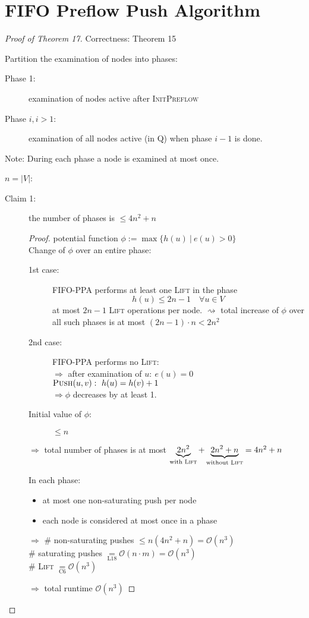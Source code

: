 \documentclass[12pt,oneside,a4paper,parskip=on,fleqn]{scrartcl}
\begin{document}
\section*{FIFO Preflow Push Algorithm} %
\label{sec:fifo_preflow_push_algorithm}
	\begin{proof}[Proof of Theorem 17]
		Correctness: Theorem 15 \checkmark

		Partition the examination of nodes into phases:
		\begin{description}
			\item[Phase 1:] examination of nodes active after \textsc{InitPreflow}
			\item[Phase $i,i>1$:] examination of all nodes active (\glqq in Q\grqq) when phase $i-1$ is done.
		\end{description}
		Note: During each phase a node is examined at most once.

		$n=|V|$:
		\begin{description}
			\item[Claim 1:] the number of phases is $\leq 4n^2 + n$
			\begin{proof}
				potential function $\phi := \max\{h(u)\ |\ e(u) > 0\}$\\
				Change of $\phi$ over an entire phase:
				\begin{description}
					\item[1st case:]FIFO-PPA performs at least one \textsc{Lift} in the phase
					\[
						h(u) \leq 2n-1 \quad \forall u\in V
					\]
					at most $2n-1$ \textsc{Lift} operations per node.
					$\rightsquigarrow$ total increase of $\phi$ over all such phases is at most $(2n-1)\cdot n < 2n^2$
					\item[2nd case:] FIFO-PPA performs no \textsc{Lift}:\\
					$\Rightarrow$ after examination of $u:\ e(u) = 0$\\
					$\textsc{Push}(u,v):\ h(u) = h(v) + 1$\\
					$\Rightarrow \phi$ decreases by at least 1.
					\item[Initial value of $\phi$:] $\leq n$
				\end{description}
				$\Rightarrow$ total number of phases is at most $\underbrace{2n^2}_{\text{with}\textsc{ Lift}} + \underbrace{2n^2+n}_{\text{without}\textsc{ Lift}} = 4n^2 + n$

				In each phase:
				\begin{itemize}
					\item at most one non-saturating push per node
					\item each node is considered at most once in a phase
				\end{itemize}
				$\Rightarrow$ \# non-saturating pushes $\leq n(4n^2+n) = \mathcal{O}(n^3)$\\
				\# saturating pushes $\underset{\text{L18}}{=} \mathcal{O}(n\cdot m) = \mathcal{O}(n^3)$\\
				\# \textsc{Lift} $\underset{\text{C6}}{=} \mathcal{O}(n^3)$

				$\Rightarrow$ total runtime $\mathcal{O}(n^3)$
			\end{proof}
		\end{description}
	\end{proof}
\end{document}
